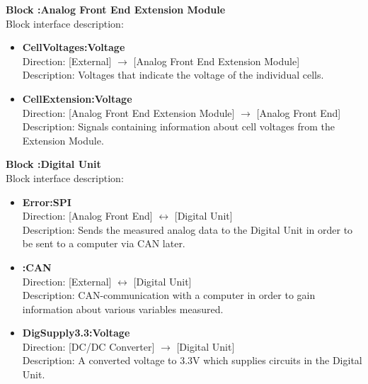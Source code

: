 \textbf{Block :Analog Front End Extension Module}\\
Block interface description:
\begin{itemize}
	\item \textbf{CellVoltages:Voltage}\\
	Direction: [External] $\rightarrow$ [Analog Front End Extension Module]\\
	Description: Voltages that indicate the voltage of the individual cells.
	\item \textbf{CellExtension:Voltage}\\
	Direction: [Analog Front End Extension Module] $\rightarrow$ [Analog Front End]\\
	Description: Signals containing information about cell voltages from the Extension Module. 
\end{itemize}

\textbf{Block :Digital Unit}\\
Block interface description:
\begin{itemize}
	\item \textbf{Error:SPI}\\
	Direction: [Analog Front End] $\leftrightarrow$ [Digital Unit]\\
	Description: Sends the measured analog data to the Digital Unit in order to be sent to a computer via CAN later.
	\item \textbf{:CAN}\\
	Direction: [External] $\leftrightarrow$ [Digital Unit]\\
	Description: CAN-communication with a computer in order to gain information about various variables measured.
	\item \textbf{DigSupply3.3:Voltage}\\
	Direction: [DC/DC Converter] $\rightarrow$ [Digital Unit]\\
	Description: A converted voltage to 3.3V which supplies circuits in the Digital Unit. 
\end{itemize}

